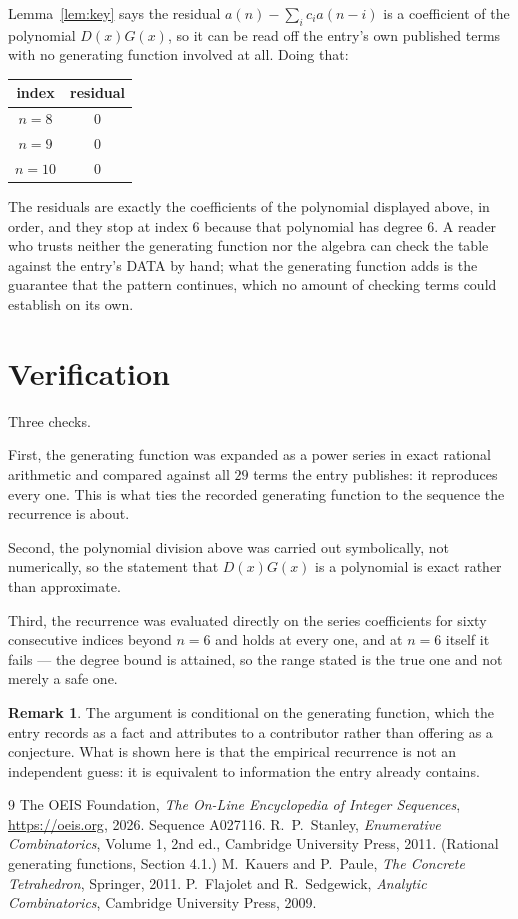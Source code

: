 \documentclass[11pt,a4paper]{article}
\theoremstyle{plain}
\theoremstyle{definition}
\newtheorem{remark}[theorem]{Remark}
\begin{document}
Lemma~\ref{lem:key} says the residual $a(n)-\sum_ic_ia(n-i)$ is a coefficient of the
polynomial $D(x)G(x)$, so it can be read off the entry's own published terms with no
generating function involved at all. Doing that:
\begin{center}
\begin{tabular}{cc}
index & residual \\ \hline
$n=8$ & $0$ \\
$n=9$ & $0$ \\
$n=10$ & $0$
\end{tabular}
\end{center}
The residuals are exactly the coefficients of the polynomial displayed above, in order, and
they stop at index $6$ because that polynomial has degree $6$. A reader who trusts
neither the generating function nor the algebra can check the table against the entry's DATA
by hand; what the generating function adds is the guarantee that the pattern continues, which
no amount of checking terms could establish on its own.

\section{Verification}

Three checks.

First, the generating function was expanded as a power series in exact rational arithmetic and
compared against all $29$ terms the entry publishes: it reproduces every one. This is
what ties the recorded generating function to the sequence the recurrence is about.

Second, the polynomial division above was carried out symbolically, not numerically, so the
statement that $D(x)G(x)$ is a polynomial is exact rather than approximate.

Third, the recurrence was evaluated directly on the series coefficients for sixty consecutive
indices beyond $n=6$ and holds at every one, and at $n=6$ itself it fails --- the
degree bound is attained, so the range stated is the true one and not merely a safe one.

\begin{remark}
The argument is conditional on the generating function, which the entry records as a fact and
attributes to a contributor rather than offering as a conjecture. What is shown here is that
the empirical recurrence is not an independent guess: it is equivalent to information the
entry already contains.
\end{remark}

\begin{thebibliography}{9}
 The OEIS Foundation, \emph{The On-Line Encyclopedia of Integer
Sequences}, \url{https://oeis.org}, 2026. Sequence A027116.
 R.~P.~Stanley, \emph{Enumerative Combinatorics}, Volume 1, 2nd ed.,
Cambridge University Press, 2011. (Rational generating functions, Section 4.1.)
 M.~Kauers and P.~Paule, \emph{The Concrete Tetrahedron}, Springer, 2011.
 P.~Flajolet and R.~Sedgewick, \emph{Analytic Combinatorics}, Cambridge
University Press, 2009.
\end{thebibliography}
\end{document}
